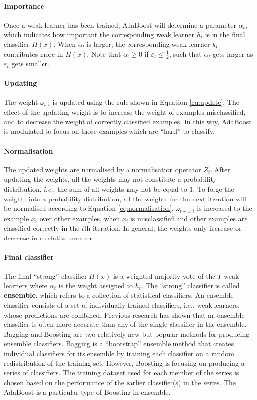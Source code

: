 \paragraph{Importance}Once a weak learner has been trained, AdaBoost will determine a parameter $\alpha_{t}$, which indicates how important the corresponding weak learner $h_{t}$ is  in the final classifier $H(x)$. When $\alpha_{t}$ is larger, the corresponding weak learner $h_{t}$ contributes more in $H(x)$. Note that $\alpha_{t} \geq 0$ if $\varepsilon_{t} \leq \frac{1}{2}$, such that $\alpha_{t}$ gets larger as $\varepsilon_{t}$ gets smaller.

\paragraph{Updating}The weight $\omega_{t,i}$ is updated using the rule shown in \mbox{Equation} \ref{eq:update}. The effect of the updating weight is to increase the weight of examples misclassified, and to decrease the weight of correctly classified examples. In this way, AdaBoost is modulated to focus on those examples which are ``hard'' to classify.

\paragraph{Normalisation}The updated weights are normalised by a normalisation operator $Z_{t}$. After updating the weights, all the weights may not constitute a probability distribution, \textit{i.e.}, the sum of all weights may not be equal to $1$. To forge the weights into a probability distribution, all the weights for the next iteration will be normalised according to \mbox{Equation} \ref{eq:normalisation}. $\omega_{t+1,i}$ is increased to the example $x_{i}$ over other examples, when $x_{i}$ is misclassified and other examples are classified correctly in the $t$th iteration. In general, the weights only increase or decrease in a relative manner.

\paragraph{Final classifier}
The final ``strong'' classifier $H(x)$ is a weighted majority vote of the $T$ weak learners where $\alpha_{t}$ is the weight assigned to $h_{t}$. The ``strong'' classifier is called \textbf{ensemble}, which refers to a collection of statistical classifiers. An ensemble classifier consists of a set of individually trained classifiers, i.e., weak learners, whose predictions are combined. Previous research \cite{Opitz1999} has shown that an ensemble classifier is often more accurate than any of the single classifier in the ensemble. Bagging \cite{Breiman1996} and Boosting \cite{Freund1996} are two relatively new but popular methods for producing ensemble classifiers. Bagging is a ``bootstrap'' \cite{Efron1993} ensemble method that creates individual classifiers for its ensemble by training each classifier on a random redistribution of the training set. However, Boosting is focusing on producing a series of classifiers. The training dataset used for each member of the series is chosen based on the performance of the earlier classifier(s) in the series. The AdaBoost is a particular type of Boosting in ensemble.
